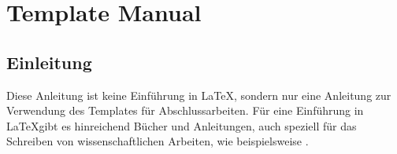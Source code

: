 %
\chapter{Template Manual}
\section{Einleitung}
Diese Anleitung ist keine Einführung in \LaTeX, sondern nur eine Anleitung zur Verwendung des Templates für Abschlussarbeiten. Für eine Einführung in \LaTeX gibt es hinreichend Bücher und Anleitungen, auch speziell für das Schreiben von wissenschaftlichen Arbeiten, wie beispielsweise \citep{schlosser2016wissenschaftliche}.
